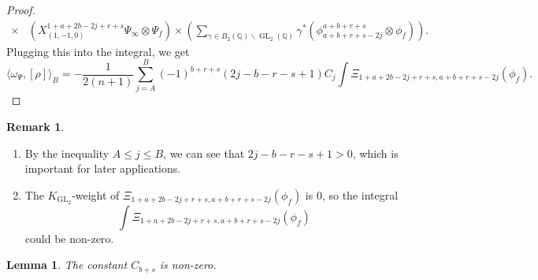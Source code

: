\documentclass[11pt, a4paper]{amsart}
\theoremstyle{plain}
\newtheorem{lemma}[theorem]{Lemma}
\theoremstyle{definition}
\newtheorem{remark}[theorem]{Remark}
\numberwithin{equation}{section}
\def\QQ{\mathbb{Q}}
\DeclareMathOperator{\GL}{\mathrm{GL}}
\begin{document}
\begin{proof}
\begin{align*}
        \times & (X^{1 + a + 2b -2j + r + s}_{(1, -1, 0)} \Psi_{\infty} \otimes \Psi_f ) \times (\sum\limits_{\gamma \in B_{2}(\QQ) \backslash \GL_2(\QQ)} \gamma^{*} (\phi^{a + b + r + s}_{a + b + r + s -2j} \otimes \phi_f)). 
    \end{align*}
    Plugging this into the integral, we get
    \begin{equation*}
        \langle \omega_{\Psi}, [\rho] \rangle_{B} = -\frac{1}{2(n + 1)} \sum\limits_{j = A}^{B} (-1)^{b + r + s}(2j - b - r -s  + 1)C_j \int \Xi_{1 + a + 2b -2j + r + s, a + b + r + s - 2j}(\phi_f). 
    \end{equation*}
\end{proof}

\begin{remark}
    \begin{enumerate}
        \item  By the inequality $A \le j \le B$, we can see that $2j - b -r - s + 1 > 0$, which is important for later applications. 
        \item  The $K_{\GL_2}$-weight of $\Xi_{1 + a + 2b -2j + r + s, a + b + r + s - 2j}(\phi_f)$ is $0$, so the integral 
        \begin{equation*}
            \int \Xi_{1 + a + 2b -2j + r + s, a + b + r + s - 2j}(\phi_f)
        \end{equation*}
        could be non-zero. 
    \end{enumerate}
\end{remark}

\begin{lemma}
\label{Lemma:C_nonvanish}
    The constant $C_{b + s}$ is non-zero. 
\end{lemma}
\end{document}
